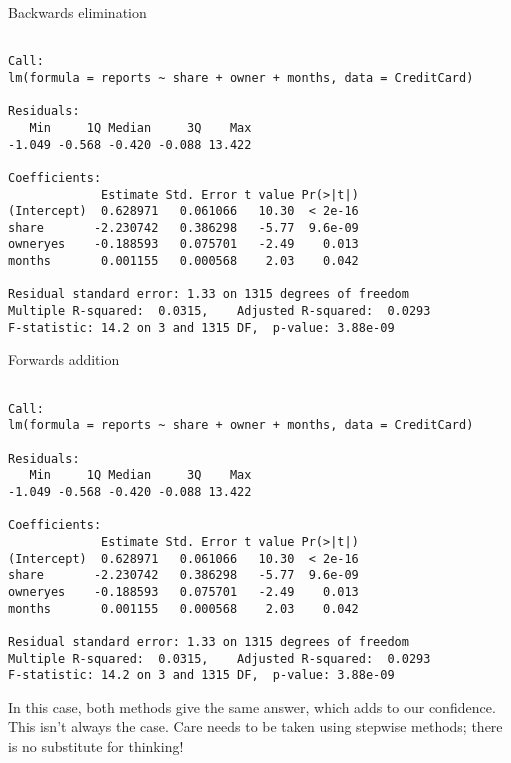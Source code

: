 \documentclass[10pt,ignorenonframetext,]{beamer}
\begin{document}
\begin{frame}[fragile]{Backwards elimination}

\begin{verbatim}

Call:
lm(formula = reports ~ share + owner + months, data = CreditCard)

Residuals:
   Min     1Q Median     3Q    Max 
-1.049 -0.568 -0.420 -0.088 13.422 

Coefficients:
             Estimate Std. Error t value Pr(>|t|)
(Intercept)  0.628971   0.061066   10.30  < 2e-16
share       -2.230742   0.386298   -5.77  9.6e-09
owneryes    -0.188593   0.075701   -2.49    0.013
months       0.001155   0.000568    2.03    0.042

Residual standard error: 1.33 on 1315 degrees of freedom
Multiple R-squared:  0.0315,    Adjusted R-squared:  0.0293 
F-statistic: 14.2 on 3 and 1315 DF,  p-value: 3.88e-09
\end{verbatim}

\end{frame}

\begin{frame}[fragile]{Forwards addition}

\scriptsize

\begin{verbatim}

Call:
lm(formula = reports ~ share + owner + months, data = CreditCard)

Residuals:
   Min     1Q Median     3Q    Max 
-1.049 -0.568 -0.420 -0.088 13.422 

Coefficients:
             Estimate Std. Error t value Pr(>|t|)
(Intercept)  0.628971   0.061066   10.30  < 2e-16
share       -2.230742   0.386298   -5.77  9.6e-09
owneryes    -0.188593   0.075701   -2.49    0.013
months       0.001155   0.000568    2.03    0.042

Residual standard error: 1.33 on 1315 degrees of freedom
Multiple R-squared:  0.0315,    Adjusted R-squared:  0.0293 
F-statistic: 14.2 on 3 and 1315 DF,  p-value: 3.88e-09
\end{verbatim}

\normalsize
In this case, both methods give the same answer, which adds to our
confidence. This isn't always the case. Care needs to be taken using
stepwise methods; there is no substitute for thinking!

\end{frame}
\end{document}
